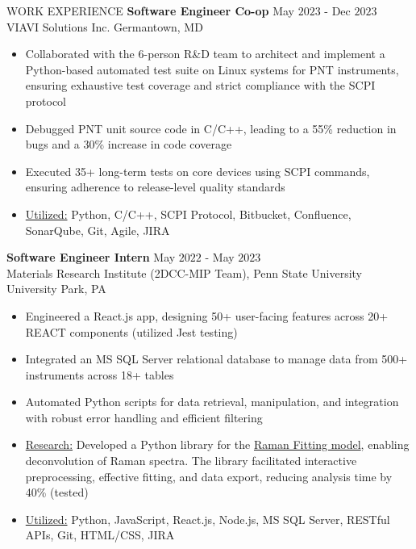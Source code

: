 \documentclass{resume} %
\begin{document}
\begin{rSection}{WORK EXPERIENCE}
{\bf Software Engineer Co-op} \hfill May $2023$ - Dec $2023$\\
VIAVI Solutions Inc. \hfill Germantown, MD
\begin{itemize}[itemsep = -4pt]
    \item Collaborated with the $6$-person R\&D team to architect and implement a Python-based automated test suite on Linux systems for PNT instruments, ensuring exhaustive test coverage and strict compliance with the SCPI protocol
    \item Debugged PNT unit source code in C/C++, leading to a 55\% reduction in bugs and a 30\% increase in code coverage
    \item Executed 35+ long-term tests on core devices using SCPI commands, ensuring adherence to release-level quality standards
    \item \underline{Utilized:} Python, C/C++, SCPI Protocol, Bitbucket, Confluence, SonarQube, Git, Agile, JIRA
\end{itemize}

{\bf Software Engineer Intern} \hfill May $2022$ - May $2023$\\
Materials Research Institute (2DCC-MIP Team), Penn State University \hfill University Park, PA
\begin{itemize}[itemsep = -4pt]
    \item Engineered a React.js app, designing 50+ user-facing features across 20+ REACT components (utilized Jest testing)
    \item Integrated an MS SQL Server relational database to manage data from 500+ instruments across 18+ tables
    \item Automated Python scripts for data retrieval, manipulation, and integration with robust error handling and efficient filtering
    \item \underline{Research:} Developed a Python library for the {\href{https://github.com/harshitjain17/Raman-Peak-Fitting-Model/}{Raman Fitting model}}, enabling deconvolution of Raman spectra. The library facilitated interactive preprocessing, effective fitting, and data export, reducing analysis time by 40\% (tested)
    \item \underline{Utilized:} Python, JavaScript, React.js, Node.js, MS SQL Server, RESTful APIs, Git, HTML/CSS, JIRA
\end{itemize}

\end{rSection} 


\end{document}
